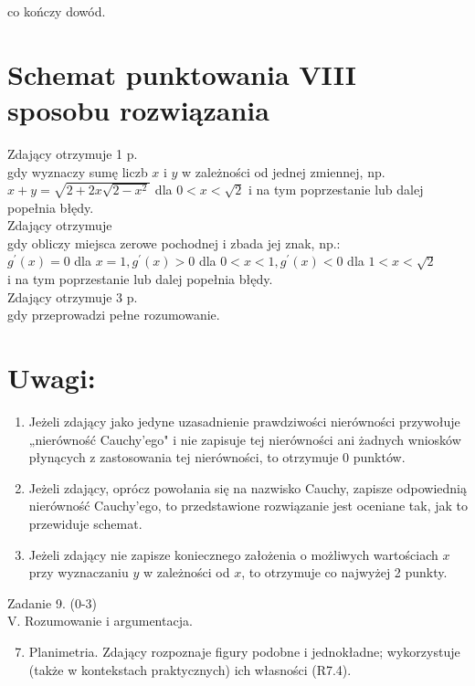 \documentclass[10pt]{article}
\begin{document}
co kończy dowód.

\section*{Schemat punktowania VIII sposobu rozwiązania}
Zdający otrzymuje 1 p.\\
gdy wyznaczy sumę liczb $x$ i $y$ w zależności od jednej zmiennej, np. $x+y=\sqrt{2+2 x \sqrt{2-x^{2}}}$ dla $0<x<\sqrt{2}$ i na tym poprzestanie lub dalej popełnia błędy.\\
Zdający otrzymuje\\
gdy obliczy miejsca zerowe pochodnej i zbada jej znak, np.:\\
$g^{\prime}(x)=0$ dla $x=1, g^{\prime}(x)>0$ dla $0<x<1, g^{\prime}(x)<0$ dla $1<x<\sqrt{2}$\\
i na tym poprzestanie lub dalej popełnia błędy.\\
Zdający otrzymuje 3 p.\\
gdy przeprowadzi pełne rozumowanie.

\section*{Uwagi:}
\begin{enumerate}
  \item Jeżeli zdający jako jedyne uzasadnienie prawdziwości nierówności przywołuje „nierówność Cauchy'ego" i nie zapisuje tej nierówności ani żadnych wniosków płynących z zastosowania tej nierówności, to otrzymuje 0 punktów.
  \item Jeżeli zdający, oprócz powołania się na nazwisko Cauchy, zapisze odpowiednią nierówność Cauchy'ego, to przedstawione rozwiązanie jest oceniane tak, jak to przewiduje schemat.
  \item Jeżeli zdający nie zapisze koniecznego założenia o możliwych wartościach $x$ przy wyznaczaniu $y$ w zależności od $x$, to otrzymuje co najwyżej 2 punkty.
\end{enumerate}

Zadanie 9. (0-3)\\
V. Rozumowanie i argumentacja.

\begin{displayquote}

\begin{enumerate}
  \setcounter{enumi}{6}
  \item Planimetria. Zdający rozpoznaje figury podobne i jednokładne; wykorzystuje (także w kontekstach praktycznych) ich własności (R7.4).
\end{enumerate}
\end{displayquote}
\end{document}
